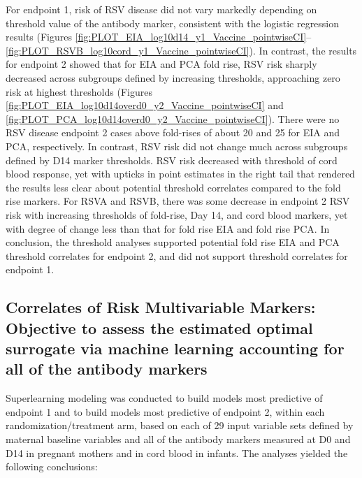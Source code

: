 \documentclass[11pt]{article}
\begin{document}
For endpoint 1, risk of RSV disease did not vary markedly depending on threshold value of the antibody marker, consistent with the logistic regression results (Figures \ref{fig:PLOT_EIA_log10d14_y1_Vaccine_pointwiseCI}--\ref{fig:PLOT_RSVB_log10cord_y1_Vaccine_pointwiseCI}). In contrast, the results for endpoint 2 showed that for EIA and PCA fold rise, RSV risk sharply decreased across subgroups defined by increasing thresholds, approaching zero risk at highest thresholds (Figures \ref{fig:PLOT_EIA_log10d14overd0_y2_Vaccine_pointwiseCI} and \ref{fig:PLOT_PCA_log10d14overd0_y2_Vaccine_pointwiseCI}). There were no RSV disease endpoint 2 cases above fold-rises of about 20 and 25 for EIA and PCA, respectively. In contrast, RSV risk did not change much across subgroups defined by D14 marker thresholds. RSV risk decreased with threshold of cord blood response, yet with upticks in point estimates in the right tail that rendered the results less clear about potential threshold correlates compared to the fold rise markers. For RSVA and RSVB, there was some decrease in endpoint 2 RSV risk with increasing thresholds of fold-rise, Day 14, and cord blood markers, yet with degree of change less than that for fold rise EIA and fold rise PCA. In conclusion, the threshold analyses supported potential fold rise EIA and PCA threshold correlates for endpoint 2, and did not support threshold correlates for endpoint 1.

\hypertarget{correlates-of-risk-multivariable-markers-objective-to-assess-the-estimated-optimal-surrogate-via-machine-learning-accounting-for-all-of-the-antibody-markers}{%
\subsection{Correlates of Risk Multivariable Markers: Objective to assess the estimated optimal surrogate via machine learning accounting for all of the antibody markers}\label{correlates-of-risk-multivariable-markers-objective-to-assess-the-estimated-optimal-surrogate-via-machine-learning-accounting-for-all-of-the-antibody-markers}}

Superlearning modeling was conducted to build models most predictive of endpoint 1 and to build models most predictive of endpoint 2, within each randomization/treatment arm,
based on each of 29 input variable sets defined by maternal baseline variables and all of the antibody markers measured at D0 and D14 in pregnant mothers and in cord blood in infants. The analyses yielded the following conclusions:
\end{document}
